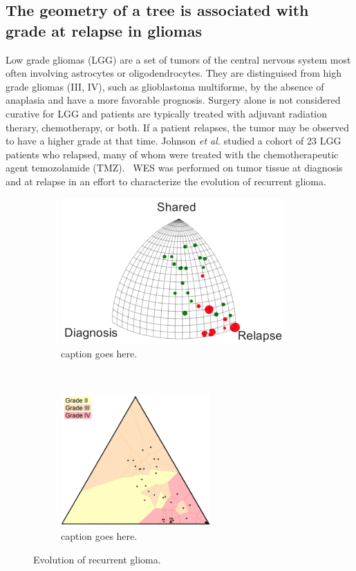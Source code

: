 \documentclass[a4paper,11pt]{article}
\begin{document}
\subsection{The geometry of a tree is associated with grade at relapse in gliomas}

Low grade gliomas (LGG) are a set of tumors of the central nervous system most often involving astrocytes or oligodendrocytes.
They are distinguised from high grade gliomas (III, IV), such as glioblastoma multiforme, by the absence of anaplasia and have a more favorable prognosis.
Surgery alone is not considered curative for LGG and patients are typically treated with adjuvant radiation therary, chemotherapy, or both.
If a patient relapses, the tumor may be observed to have a higher grade at that time.
Johnson \textit{et al.} studied a cohort of 23 LGG patients who relapsed, many of whom were treated with the chemotherapeutic agent temozolamide (TMZ).~\cite{johnson2014mutational}
WES was performed on tumor tissue at diagnosis and at relapse in an effort to characterize the evolution of recurrent glioma.

\begin{figure}
    \begin{subfigure}{0.5\linewidth}
    \centering
    \includegraphics[height=2.2in]{figures/glioma_triplet.png}
    \caption{caption goes here.}
    \end{subfigure}
    ~
    \begin{subfigure}{0.5\linewidth}
    \centering
    \includegraphics[height=2in]{figures/glioma_voronoi_stage.png}
    \caption{caption goes here.}
    \end{subfigure}

    \caption{Evolution of recurrent glioma.}
    \label{fig:gliomaTMZ}
\end{figure}
\end{document}
